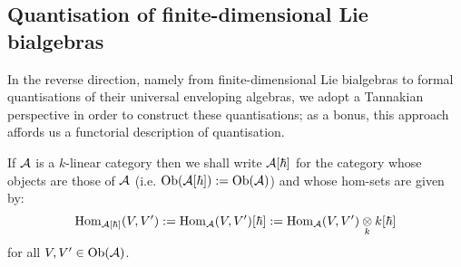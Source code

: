     \subsection{Quantisation of finite-dimensional Lie bialgebras}
        In the reverse direction, namely from finite-dimensional Lie bialgebras to formal quantisations of their universal enveloping algebras, we adopt a Tannakian perspective in order to construct these quantisations; as a bonus, this approach affords us a functorial description of quantisation. 
        
        \begin{convention}
            If $\mathcal{A}$ is a $k$-linear category then we shall write $\mathcal{A}[\hbar]$ for the category whose objects are those of $\mathcal{A}$ (i.e. $\mathrm{Ob}(\mathcal{A}[\hbar]) := \mathrm{Ob}(\mathcal{A})$) and whose hom-sets are given by:
                $$\Hom_{\calA[\hbar]}(V, V') := \Hom_{\calA}(V, V')[\hbar] := \Hom_{\calA}(V, V') \tensor_k k[\hbar]$$
            for all $V, V' \in \mathrm{Ob}(\mathcal{A})$.
        \end{convention}
        
